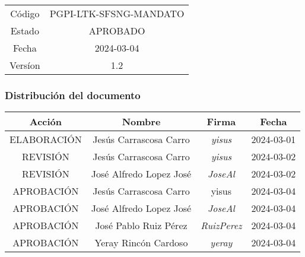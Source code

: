 \documentclass[
	a4paper, %
	12pt, %
]{CSSullivanBusinessReport}
\begin{document}
\begin{twothirdswidth}
        \begin{tabular}{cc}
        \toprule
            Código& PGPI-LTK-SFSNG-MANDATO \\
             Estado& APROBADO\\
             Fecha& 2024-03-04 \\
             Versíon& 1.2\\
             \bottomrule
        \end{tabular}
       
    \subsubsection*{Distribución del documento}
        \begin{tabular}{|c|c|c|c|}
        \toprule
         \textbf{Acción} & \textbf{Nombre} &\textbf{Firma} & \textbf{Fecha}\\
         \midrule
         ELABORACIÓN & Jesús Carrascosa Carro & \textit{yisus }& 2024-03-01\\
         \midrule
         REVISIÓN & Jesús Carrascosa Carro & \textit{yisus} & 2024-03-02\\
         REVISIÓN & José Alfredo Lopez José & \textit{JoseAl} & 2024-03-02\\
         \midrule
         APROBACIÓN & Jesús Carrascosa Carro & yisus & 2024-03-04\\
         APROBACIÓN & José Alfredo Lopez José & \textit{JoseAl} & 2024-03-04\\
         APROBACIÓN & José Pablo Ruiz Pérez & \textit{RuizPerez} & 2024-03-04\\
         APROBACIÓN & Yeray Rincón Cardoso & \textit{yeray} & 2024-03-04\\
         \bottomrule
         
        \end{tabular}
\end{twothirdswidth}

\newpage


\begin{twothirdswidth} %
	\tableofcontents %
\end{twothirdswidth}
\end{document}
